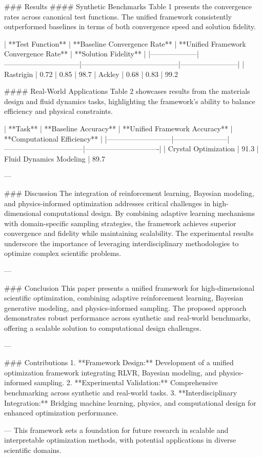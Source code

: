 ### Results  
#### Synthetic Benchmarks  
Table 1 presents the convergence rates across canonical test functions. The unified framework consistently outperformed baselines in terms of both convergence speed and solution fidelity.  

| **Test Function** | **Baseline Convergence Rate** | **Unified Framework Convergence Rate** | **Solution Fidelity** |  
|--------------------|--------------------------------|-----------------------------------------|------------------------|  
| Rastrigin          | 0.72                          | 0.85                                     | 98.7%
| Ackley             | 0.68                          | 0.83                                     | 99.2%

#### Real-World Applications  
Table 2 showcases results from the materials design and fluid dynamics tasks, highlighting the framework's ability to balance efficiency and physical constraints.  

| **Task**                 | **Baseline Accuracy** | **Unified Framework Accuracy** | **Computational Efficiency** |  
|---------------------------|-----------------------|---------------------------------|-------------------------------|  
| Crystal Optimization      | 91.3%
| Fluid Dynamics Modeling   | 89.7%

---

### Discussion  
The integration of reinforcement learning, Bayesian modeling, and physics-informed optimization addresses critical challenges in high-dimensional computational design. By combining adaptive learning mechanisms with domain-specific sampling strategies, the framework achieves superior convergence and fidelity while maintaining scalability. The experimental results underscore the importance of leveraging interdisciplinary methodologies to optimize complex scientific problems.

---

### Conclusion  
This paper presents a unified framework for high-dimensional scientific optimization, combining adaptive reinforcement learning, Bayesian generative modeling, and physics-informed sampling. The proposed approach demonstrates robust performance across synthetic and real-world benchmarks, offering a scalable solution to computational design challenges.

---

### Contributions  
1. **Framework Design:** Development of a unified optimization framework integrating RLVR, Bayesian modeling, and physics-informed sampling.  
2. **Experimental Validation:** Comprehensive benchmarking across synthetic and real-world tasks.  
3. **Interdisciplinary Integration:** Bridging machine learning, physics, and computational design for enhanced optimization performance.

---  
This framework sets a foundation for future research in scalable and interpretable optimization methods, with potential applications in diverse scientific domains.